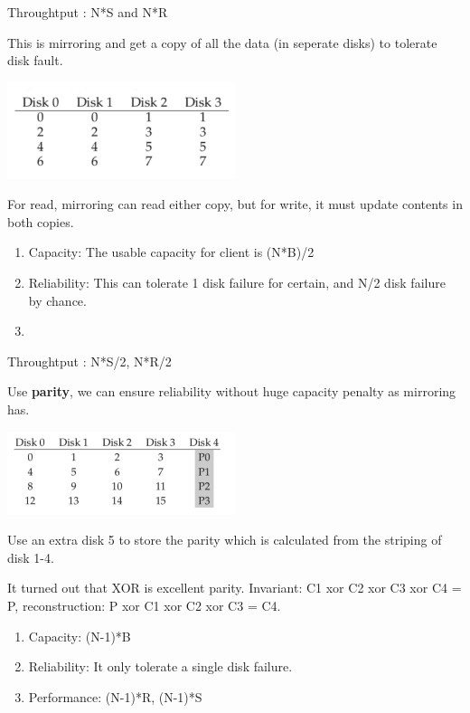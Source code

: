         Throughtput : N*S and N*R


        This is mirroring and get a copy of all the data (in seperate disks) to 
        tolerate disk fault.

        \includegraphics[width=0.5\textwidth]{chapters/Persistence/persistence/level_1.png}

        For read, mirroring can read either copy, but for write, it must update
        contents in both copies.

        \begin{enumerate}
            \item Capacity: The usable capacity for client is (N*B)/2
            \item Reliability: This can tolerate 1 disk failure for certain, and 
            N/2 disk failure by chance.
            \item 
        \end{enumerate}

        Throughtput : N*S/2, N*R/2



        Use \textbf{parity}, we can ensure reliability without huge capacity 
        penalty as mirroring has.

        \includegraphics[width=0.5\textwidth]{chapters/Persistence/persistence/level_4.png}

        Use an extra disk 5 to store the parity which is calculated from 
        the striping of disk 1-4.

        It turned out that XOR is excellent parity. Invariant: C1 xor C2 xor C3 xor C4 = P,
        reconstruction: P xor C1 xor C2 xor C3 = C4.


        \begin{enumerate}
            \item Capacity: (N-1)*B
            \item Reliability: It only tolerate a single disk failure.
            \item Performance: (N-1)*R, (N-1)*S
        \end{enumerate}


